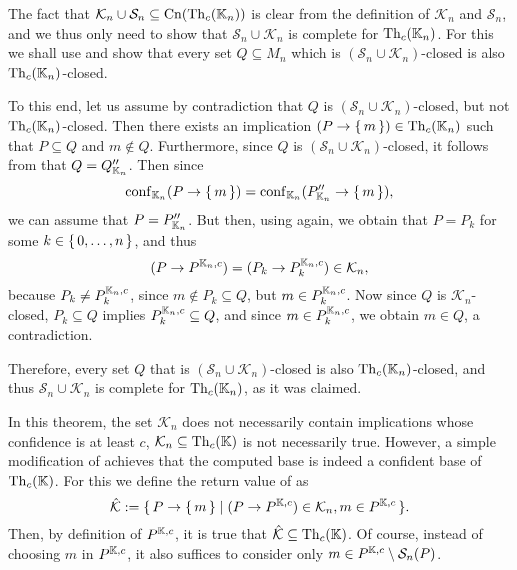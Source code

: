 \begin{Proof}
  The fact that $\mathcal{K}_{n} \cup \mathcal{S}_{n} \subseteq \operatorname{Cn}(\operatorname{Th}_{c}({\mathbb{K}}_{n}))$
  is clear from the definition of $\mathcal{K}_{n}$ and $\mathcal{S}_{n}$, and we thus
  only need to show that $\mathcal{S}_{n} \cup \mathcal{K}_{n}$ is complete for
  $\operatorname{Th}_{c}({\mathbb{K}}_{n})$.  For this we shall use
   and show that every set $Q \subseteq M_{n}$
  which is $(\mathcal{S}_{n} \cup \mathcal{K}_{n})$-closed is also $\operatorname{Th}_{c}({\mathbb{K}}_{n})$-closed.

  To this end, let us assume by contradiction that $Q$ is $(\mathcal{S}_{n} \cup
  \mathcal{K}_{n})$-closed, but not $\operatorname{Th}_{c}({\mathbb{K}}_{n})$-closed.  Then there exists an
  implication $(P \to {\ensuremath{\{\,m\,\}}}) \in \operatorname{Th}_{c}({\mathbb{K}}_{n})$ such that $P \subseteq Q$ and $m
  \notin Q$.  Furthermore, since $Q$ is $(\mathcal{S}_{n} \cup \mathcal{K}_{n})$-closed,
  it follows from 
  that $Q = Q_{{\mathbb{K}}_{n}}''$.  Then since
  \begin{equation*}
    \operatorname{conf}_{{\mathbb{K}}_{n}}(P \to {\ensuremath{\{\,m\,\}}}) = \operatorname{conf}_{{\mathbb{K}}_{n}}(P_{{\mathbb{K}}_{n}}'' \to {\ensuremath{\{\,m\,\}}}),
  \end{equation*}
  we can assume that $P = P_{{\mathbb{K}}_{n}}''$.  But then, using
   again, we obtain
  that $P = P_{k}$ for some $k \in {\ensuremath{\{\, 0, \dots, n \,\}}}$, and thus
  \begin{equation*}
    (P \to P^{{\mathbb{K}}_{n}, c}) = (P_{k} \to P_{k}^{{\mathbb{K}}_{n}, c}) \in \mathcal{K}_{n},
  \end{equation*}
  because $P_{k} \neq P_{k}^{{\mathbb{K}}_{n}, c}$, since $m \notin P_{k} \subseteq Q$, but $m
  \in P_{k}^{{\mathbb{K}}_{n}, c}$.  Now since $Q$ is $\mathcal{K}_{n}$-closed, $P_{k} \subseteq
  Q$ implies $P_{k}^{{\mathbb{K}}_{n}, c} \subseteq Q$, and since $m \in P_{k}^{{\mathbb{K}}_{n}, c}$,
  we obtain $m \in Q$, a contradiction.

  Therefore, every set $Q$ that is $(\mathcal{S}_{n} \cup \mathcal{K}_{n})$-closed is also
  $\operatorname{Th}_{c}({\mathbb{K}}_{n})$-closed, and thus $\mathcal{S}_{n} \cup \mathcal{K}_{n}$ is
  complete for $\operatorname{Th}_{c}({\mathbb{K}}_{n})$, as it was claimed.
\end{Proof}

In this theorem, the set $\mathcal{K}_{n}$ does not necessarily contain implications whose
confidence is at least $c$, \ie $\mathcal{K}_{n} \subseteq \operatorname{Th}_{c}({\mathbb{K}})$ is not
necessarily true.  However, a simple modification of
 achieves that the computed base is indeed a
confident base of $\operatorname{Th}_{c}({\mathbb{K}})$.  For this we define the return value of
 as
\begin{equation*}
  \hat{\mathcal{K}} := {\{\, P \to {\ensuremath{\{\,m\,\}}} \mid (P \to P^{{\mathbb{K}}, c}) \in \mathcal{K}_{n},
    m \in P^{{\mathbb{K}}, c} \,\}}.
\end{equation*}
Then, by definition of $P^{{\mathbb{K}}, c}$, it is true that $\hat{\mathcal{K}} \subseteq
\operatorname{Th}_{c}({\mathbb{K}})$.  Of course, instead of choosing $m$ in $P^{{\mathbb{K}}, c}$, it also suffices
to consider only $m \in P^{{\mathbb{K}}, c} \setminus \mathcal{S}_{n}(P)$.

